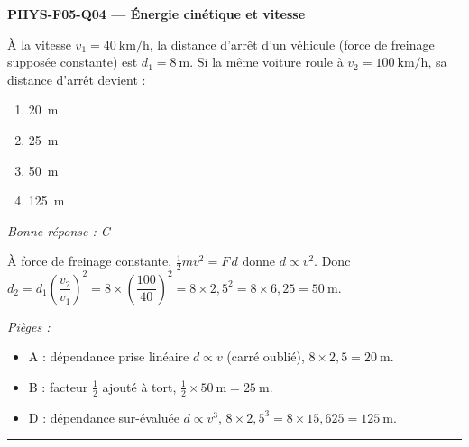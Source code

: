 \documentclass[11pt,a4paper]{article}
\begin{document}
\noindent\textbf{PHYS-F05-Q04 --- Énergie cinétique et vitesse}\par
À la vitesse $v_1=\qty{40}{\kilo\metre\per\hour}$, la distance d'arrêt d'un véhicule (force de
freinage supposée constante) est $d_1=\qty{8}{\metre}$. Si la même voiture roule à
$v_2=\qty{100}{\kilo\metre\per\hour}$, sa distance d'arrêt devient :
\begin{enumerate}[label=\Alph*)]
\item \qty{20}{\metre}
\item \qty{25}{\metre}
\item \qty{50}{\metre}
\item \qty{125}{\metre}
\end{enumerate}
\textit{Bonne réponse : C}\par
À force de freinage constante, $\tfrac12 m v^2=F\,d$ donne $d\propto v^2$. Donc
$d_2=d_1\left(\dfrac{v_2}{v_1}\right)^2=8\times\left(\dfrac{100}{40}\right)^2=8\times2{,}5^2=8\times6{,}25=\qty{50}{\metre}$.\par
\textit{Pièges :}
\begin{itemize}
\item A : dépendance prise linéaire $d\propto v$ (carré oublié), $8\times2{,}5=\qty{20}{\metre}$.
\item B : facteur $\tfrac12$ ajouté à tort, $\tfrac12\times\qty{50}{\metre}=\qty{25}{\metre}$.
\item D : dépendance sur-évaluée $d\propto v^3$, $8\times2{,}5^3=8\times15{,}625=\qty{125}{\metre}$.
\end{itemize}
\vspace{8pt}\hrule\vspace{8pt}
\end{document}
